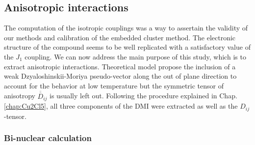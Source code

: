 \documentclass[12pt]{report}
\numberwithin{equation}{section}
\begin{document}
\subsection{Anisotropic interactions}

The computation of the isotropic couplings was a way to assertain the validity of our methods and calibration of the embedded cluster method.
The electronic structure of the compound seems to be well replicated with a satisfactory value of the $J_1$ coupling.
We can now address the main purpose of this study, which is to extract anisotropic interactions.
Theoretical model propose the inclusion of a weak Dzyaloshinskii-Moriya pseudo-vector along the out of plane direction to account for the behavior at low temperature but the symmetric tensor of anisotropy $\overline{\overline{D}}_{ij}$ is usually left out.
Following the procedure explained in Chap.\ref{chap:Cu2Cl5}, all three components of the DMI were extracted as well as the $D_{ij}$-tensor.


\subsubsection*{Bi-nuclear calculation}
\end{document}
